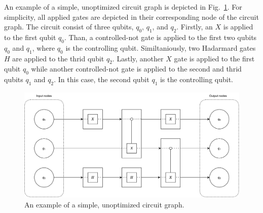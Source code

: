 An example of a simple, unoptimized circuit graph is depicted in Fig.~\ref{fig:circuit_graph_unoptimized}. For simplicity, all applied gates are depicted in their corresponding node of the circuit graph. The circuit consist of three qubits, $q_0$, $q_1$, and $q_2$. Firstly, an $X$ is applied to the first qubit $q_0$. Than, a controlled-not gate is applied to the first two qubits $q_0$ and $q_1$, where $q_0$ is the controlling qubit. Similtaniously, two Hadarmard gates $H$ are applied to the thrid qubit $q_2$. Lastly, another $X$ gate is applied to the first qubit $q_0$ while another controlled-not gate is applied to the second and thrid qubits $q_1$ and $q_2$. In this case, the second qubit $q_1$ is the controlling qubit.
\begin{figure}[htp]
    \centering     
    \includegraphics[width=.8\textwidth]{../figures/circuit_graph_unoptimized.pdf}
    \caption{An example of a simple, unoptimized circuit graph.}
    \label{fig:circuit_graph_unoptimized}
\end{figure}